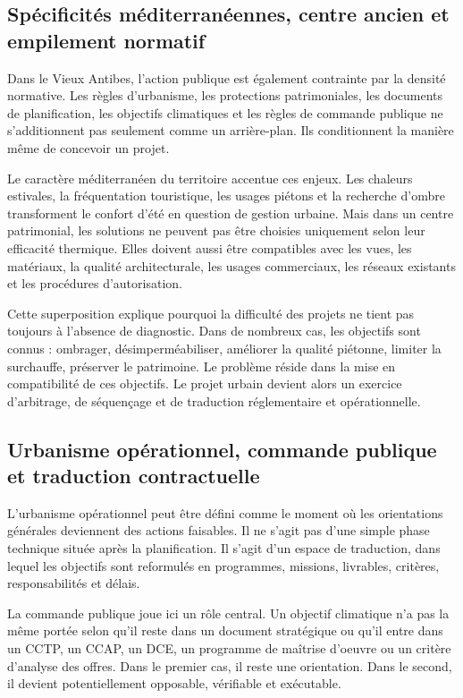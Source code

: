 \documentclass[11pt,a4paper]{report}
\begin{document}
\subsection{Spécificités méditerranéennes, centre ancien et empilement normatif}

Dans le Vieux Antibes, l'action publique est également contrainte par la densité normative. Les règles d'urbanisme, les protections patrimoniales, les documents de planification, les objectifs climatiques et les règles de commande publique ne s'additionnent pas seulement comme un arrière-plan. Ils conditionnent la manière même de concevoir un projet.

Le caractère méditerranéen du territoire accentue ces enjeux. Les chaleurs estivales, la fréquentation touristique, les usages piétons et la recherche d'ombre transforment le confort d'été en question de gestion urbaine. Mais dans un centre patrimonial, les solutions ne peuvent pas être choisies uniquement selon leur efficacité thermique. Elles doivent aussi être compatibles avec les vues, les matériaux, la qualité architecturale, les usages commerciaux, les réseaux existants et les procédures d'autorisation.

Cette superposition explique pourquoi la difficulté des projets ne tient pas toujours à l'absence de diagnostic. Dans de nombreux cas, les objectifs sont connus : ombrager, désimperméabiliser, améliorer la qualité piétonne, limiter la surchauffe, préserver le patrimoine. Le problème réside dans la mise en compatibilité de ces objectifs. Le projet urbain devient alors un exercice d'arbitrage, de séquençage et de traduction réglementaire et opérationnelle.

\subsection{Urbanisme opérationnel, commande publique et traduction contractuelle}

L'urbanisme opérationnel peut être défini comme le moment où les orientations générales deviennent des actions faisables. Il ne s'agit pas d'une simple phase technique située après la planification. Il s'agit d'un espace de traduction, dans lequel les objectifs sont reformulés en programmes, missions, livrables, critères, responsabilités et délais.

La commande publique joue ici un rôle central. Un objectif climatique n'a pas la même portée selon qu'il reste dans un document stratégique ou qu'il entre dans un CCTP, un CCAP, un DCE, un programme de maîtrise d'oeuvre ou un critère d'analyse des offres. Dans le premier cas, il reste une orientation. Dans le second, il devient potentiellement opposable, vérifiable et exécutable.
\end{document}
